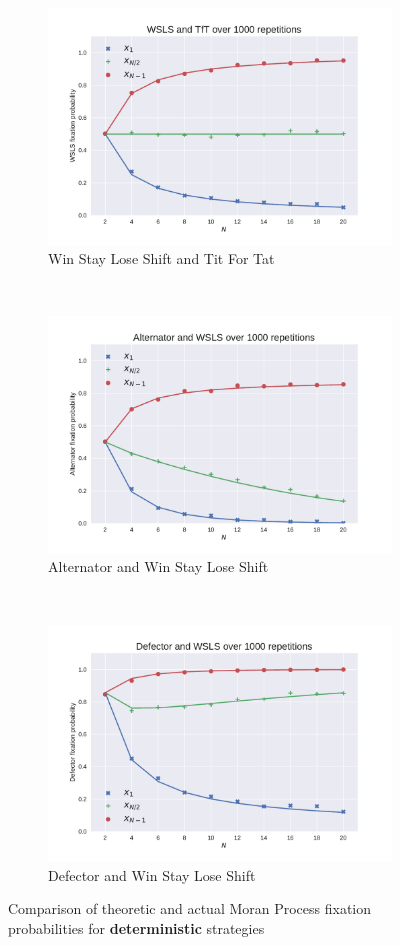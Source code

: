 \documentclass{article}
\begin{document}
\begin{figure}[!hbtp]
    \begin{subfigure}[t]{.3\textwidth}
        \centering
        \includegraphics[width=.8\textwidth]{./img/WSLS_v_TfT.pdf}
        \caption{Win Stay Lose Shift and Tit For Tat}
    \end{subfigure}%
    ~
    \begin{subfigure}[t]{.3\textwidth}
        \centering
        \includegraphics[width=.8\textwidth]{./img/Alternator_v_WSLS.pdf}
        \caption{Alternator and Win Stay Lose Shift}
    \end{subfigure}%
    ~
    \begin{subfigure}[t]{.3\textwidth}
        \centering
        \includegraphics[width=.8\textwidth]{./img/Defector_v_WSLS.pdf}
        \caption{Defector and Win Stay Lose Shift}
    \end{subfigure}%
    \caption{Comparison of theoretic and actual Moran Process fixation
             probabilities for \textbf{deterministic} strategies}
    \label{fig:comparison_deterministic}
\end{figure}
\end{document}
